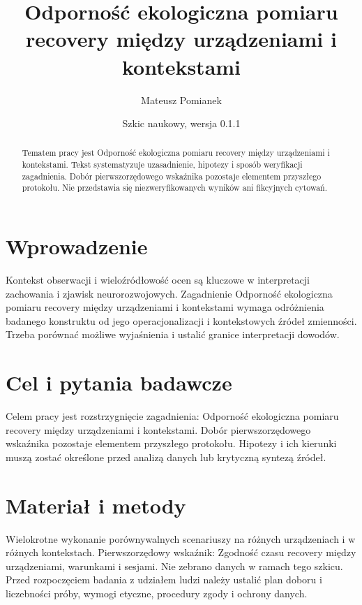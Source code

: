 \documentclass[11pt,a4paper]{article}
\title{Odporność ekologiczna pomiaru recovery między urządzeniami i kontekstami}
\author{Mateusz Pomianek}
\date{Szkic naukowy, wersja 0.1.1}
\begin{document}
\maketitle

\begin{abstract}

Tematem pracy jest Odporność ekologiczna pomiaru recovery między urządzeniami i kontekstami. Tekst systematyzuje uzasadnienie, hipotezy i sposób weryfikacji zagadnienia. Dobór pierwszorzędowego wskaźnika pozostaje elementem przyszłego protokołu. Nie przedstawia się niezweryfikowanych wyników ani fikcyjnych cytowań.

\end{abstract}

\section{Wprowadzenie}

Kontekst obserwacji i wieloźródłowość ocen są kluczowe w interpretacji zachowania i zjawisk neurorozwojowych. Zagadnienie Odporność ekologiczna pomiaru recovery między urządzeniami i kontekstami wymaga odróżnienia badanego konstruktu od jego operacjonalizacji i kontekstowych źródeł zmienności. Trzeba porównać możliwe wyjaśnienia i ustalić granice interpretacji dowodów.

\section{Cel i pytania badawcze}

Celem pracy jest rozstrzygnięcie zagadnienia: Odporność ekologiczna pomiaru recovery między urządzeniami i kontekstami. Dobór pierwszorzędowego wskaźnika pozostaje elementem przyszłego protokołu. Hipotezy i ich kierunki muszą zostać określone przed analizą danych lub krytyczną syntezą źródeł.

\section{Materiał i metody}

Wielokrotne wykonanie porównywalnych scenariuszy na różnych urządzeniach i w różnych kontekstach. Pierwszorzędowy wskaźnik: Zgodność czasu recovery między urządzeniami, warunkami i sesjami. Nie zebrano danych w ramach tego szkicu. Przed rozpoczęciem badania z udziałem ludzi należy ustalić plan doboru i liczebności próby, wymogi etyczne, procedury zgody i ochrony danych.
\end{document}
